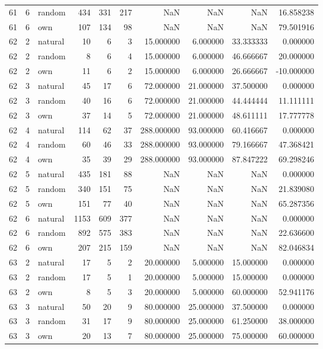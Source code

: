 \begin{table}[htbp]
\begin{tabular}{rrlrrrrrrr}
61 & 6 & random & 434 & 331 & 217 & NaN & NaN & NaN & 16.858238 \\
61 & 6 & own & 107 & 134 & 98 & NaN & NaN & NaN & 79.501916 \\
62 & 2 & natural & 10 & 6 & 3 & 15.000000 & 6.000000 & 33.333333 & 0.000000 \\
62 & 2 & random & 8 & 6 & 4 & 15.000000 & 6.000000 & 46.666667 & 20.000000 \\
62 & 2 & own & 11 & 6 & 2 & 15.000000 & 6.000000 & 26.666667 & -10.000000 \\
62 & 3 & natural & 45 & 17 & 6 & 72.000000 & 21.000000 & 37.500000 & 0.000000 \\
62 & 3 & random & 40 & 16 & 6 & 72.000000 & 21.000000 & 44.444444 & 11.111111 \\
62 & 3 & own & 37 & 14 & 5 & 72.000000 & 21.000000 & 48.611111 & 17.777778 \\
62 & 4 & natural & 114 & 62 & 37 & 288.000000 & 93.000000 & 60.416667 & 0.000000 \\
62 & 4 & random & 60 & 46 & 33 & 288.000000 & 93.000000 & 79.166667 & 47.368421 \\
62 & 4 & own & 35 & 39 & 29 & 288.000000 & 93.000000 & 87.847222 & 69.298246 \\
62 & 5 & natural & 435 & 181 & 88 & NaN & NaN & NaN & 0.000000 \\
62 & 5 & random & 340 & 151 & 75 & NaN & NaN & NaN & 21.839080 \\
62 & 5 & own & 151 & 77 & 40 & NaN & NaN & NaN & 65.287356 \\
62 & 6 & natural & 1153 & 609 & 377 & NaN & NaN & NaN & 0.000000 \\
62 & 6 & random & 892 & 575 & 383 & NaN & NaN & NaN & 22.636600 \\
62 & 6 & own & 207 & 215 & 159 & NaN & NaN & NaN & 82.046834 \\
63 & 2 & natural & 17 & 5 & 2 & 20.000000 & 5.000000 & 15.000000 & 0.000000 \\
63 & 2 & random & 17 & 5 & 1 & 20.000000 & 5.000000 & 15.000000 & 0.000000 \\
63 & 2 & own & 8 & 5 & 3 & 20.000000 & 5.000000 & 60.000000 & 52.941176 \\
63 & 3 & natural & 50 & 20 & 9 & 80.000000 & 25.000000 & 37.500000 & 0.000000 \\
63 & 3 & random & 31 & 17 & 9 & 80.000000 & 25.000000 & 61.250000 & 38.000000 \\
63 & 3 & own & 20 & 13 & 7 & 80.000000 & 25.000000 & 75.000000 & 60.000000 \\

\end{tabular}
\end{table}

